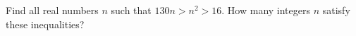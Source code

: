 Find all real numbers $n$ such that $130n>n^2>16$. How many integers $n$ satisfy these inequalities?
